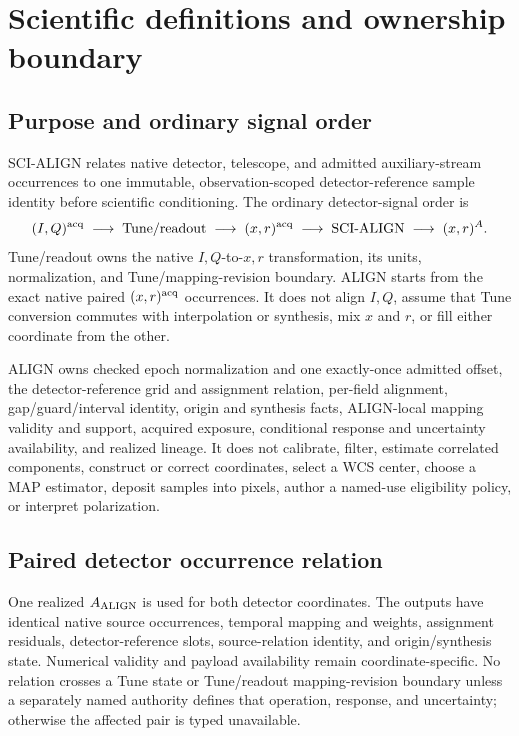 \section{Scientific definitions and ownership boundary}
\label{sec:definitions}

\subsection{Purpose and ordinary signal order}

SCI-ALIGN relates native detector, telescope, and admitted auxiliary-stream
occurrences to one immutable, observation-scoped detector-reference sample
identity before scientific conditioning.  The ordinary detector-signal order
is
\[
 (I,Q)^{\rm acq}\;\longrightarrow\;\text{Tune/readout}
 \;\longrightarrow\;(x,r)^{\rm acq}
 \;\longrightarrow\;\text{SCI-ALIGN}
 \;\longrightarrow\;(x,r)^A .
\]
Tune/readout owns the native \(I,Q\)-to-\(x,r\) transformation, its units,
normalization, and Tune/mapping-revision boundary.  ALIGN starts from the exact
native paired \((x,r)^{\rm acq}\) occurrences.  It does not align \(I,Q\),
assume that Tune conversion commutes with interpolation or synthesis, mix
\(x\) and \(r\), or fill either coordinate from the other.

ALIGN owns checked epoch normalization and one exactly-once admitted offset,
the detector-reference grid and assignment relation, per-field alignment,
gap/guard/interval identity, origin and synthesis facts, ALIGN-local mapping
validity and support, acquired exposure, conditional response and uncertainty
availability, and realized lineage.  It does not calibrate, filter, estimate
correlated components, construct or correct coordinates, select a WCS center,
choose a MAP estimator, deposit samples into pixels, author a named-use
eligibility policy, or interpret polarization.

\subsection{Paired detector occurrence relation}

One realized \(A_{\rm ALIGN}\) is used for both detector coordinates.  The
outputs have identical native source occurrences, temporal mapping and
weights, assignment residuals, detector-reference slots, source-relation
identity, and origin/synthesis state.  Numerical validity and payload
availability remain coordinate-specific.  No relation crosses a Tune state or
Tune/readout mapping-revision boundary unless a separately named authority
defines that operation, response, and uncertainty; otherwise the affected
pair is typed unavailable.


